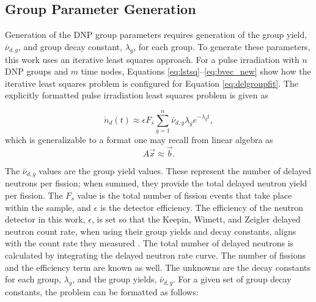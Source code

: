 \documentclass{style/nseJournal}
\begin{document}


\subsection{Group Parameter Generation}
\label{sec:group-param}

Generation of the DNP group parameters requires generation of the group yield, $\bar{\nu}_{d, g}$, and group decay constant, $\lambda_g$, for each group.
To generate these parameters, this work uses an iterative least squares approach.
For a pulse irradiation with $n$ DNP groups and $m$ time nodes, Equations \eqref{eq:lstsq}--\eqref{eq:bvec_new} show how the iterative least squares problem is configured for Equation \eqref{eq:delgroupfit}.
The explicitly formatted pulse irradiation least squares problem is given as

\begin{equation}
\dot{n}_d(t) \approx \epsilon F_s \sum_{g=1}^{n}  \bar{\nu}_{d, g} \lambda_g e^{-\lambda_g t},
\label{eq:delgroupfit}
\end{equation}
which is generalizable to a format one may recall from linear algebra as
\begin{equation}
A \vec{x} \approx \vec{b}.
\label{eq:lstsq}
\end{equation}

The $\bar{\nu}_{d, g}$ values are the group yield values. These represent the number of delayed neutrons per fission; when summed, they provide the total delayed neutron yield per fission. The $F_s$ value is the total number of fission events that take place within the sample, and $\epsilon$ is the detector efficiency. 
The efficiency of the neutron detector in this work, $\epsilon$, is set so that the Keepin, Wimett, and Zeigler delayed neutron count rate, when using their group yields and decay constants, aligns with the count rate they measured \cite{KEEPIN1957IN2}.
The total number of delayed neutrons is calculated by integrating the delayed neutron rate curve.
The number of fissions and the efficiency term are known as well. The unknowns are the decay constants for each group, $\lambda_g$, and the group yields, $\bar{\nu}_{d, g}$. 
For a given set of group decay constants, the problem can be formatted as follows:
\end{document}
